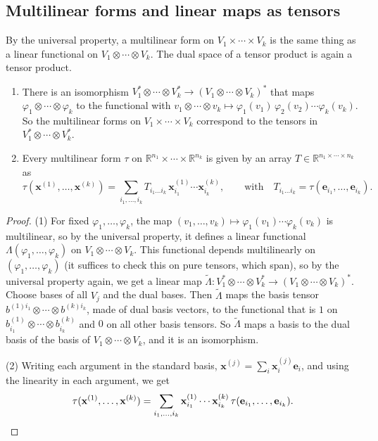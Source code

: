 \subsection{Multilinear forms and linear maps as tensors}

By the universal property, a multilinear form on $V_1 \times \cdots \times V_k$ is the same thing as a linear functional on $V_1 \otimes \cdots \otimes V_k$. The dual space of a tensor product is again a tensor product.

\begin{theorem}\label{L1-thm:multilinear-tensor}
    \begin{enumerate}
        \item There is an isomorphism $V_1^* \otimes \cdots \otimes V_k^* \to (V_1 \otimes \cdots \otimes V_k)^*$ that maps $\varphi_1 \otimes \cdots \otimes \varphi_k$ to the functional with $v_1 \otimes \cdots \otimes v_k \mapsto \varphi_1(v_1)\,\varphi_2(v_2) \cdots \varphi_k(v_k)$. So the multilinear forms on $V_1 \times \cdots \times V_k$ correspond to the tensors in $V_1^* \otimes \cdots \otimes V_k^*$.
        \item Every multilinear form $\tau$ on $\mathbb{R}^{n_1} \times \cdots \times \mathbb{R}^{n_k}$ is given by an array $T \in \mathbb{R}^{n_1 \times \cdots \times n_k}$ as
        \[\tau(\mathbf{x}^{(1)}, \ldots, \mathbf{x}^{(k)}) = \sum_{i_1, \ldots, i_k} T_{i_1 \ldots i_k}\, \mathbf{x}^{(1)}_{i_1} \cdots \mathbf{x}^{(k)}_{i_k}, \qquad \text{with} \quad T_{i_1 \ldots i_k} = \tau(\mathbf{e}_{i_1}, \ldots, \mathbf{e}_{i_k}).\]
    \end{enumerate}
\end{theorem}

\begin{proof}
    (1) For fixed $\varphi_1, \ldots, \varphi_k$, the map $(v_1, \ldots, v_k) \mapsto \varphi_1(v_1) \cdots \varphi_k(v_k)$ is multilinear, so by the universal property, it defines a linear functional $\Lambda(\varphi_1, \ldots, \varphi_k)$ on $V_1 \otimes \cdots \otimes V_k$. This functional depends multilinearly on $(\varphi_1, \ldots, \varphi_k)$ (it suffices to check this on pure tensors, which span), so by the universal property again, we get a linear map $\tilde\Lambda: V_1^* \otimes \cdots \otimes V_k^* \to (V_1 \otimes \cdots \otimes V_k)^*$. Choose bases of all $V_j$ and the dual bases. Then $\tilde\Lambda$ maps the basis tensor $b^{(1)i_1} \otimes \cdots \otimes b^{(k)i_k}$, made of dual basis vectors, to the functional that is $1$ on $b^{(1)}_{i_1} \otimes \cdots \otimes b^{(k)}_{i_k}$ and $0$ on all other basis tensors. So $\tilde\Lambda$ maps a basis to the dual basis of the basis of $V_1 \otimes \cdots \otimes V_k$, and it is an isomorphism.

    (2) Writing each argument in the standard basis, $\mathbf{x}^{(j)} = \sum_{i} \mathbf{x}^{(j)}_{i} \mathbf{e}_{i}$, and using the linearity in each argument, we get
    \[\tau(\mathbf{x}^{(1)}, \ldots, \mathbf{x}^{(k)}) = \sum_{i_1, \ldots, i_k} \mathbf{x}^{(1)}_{i_1} \cdots \mathbf{x}^{(k)}_{i_k}\, \tau(\mathbf{e}_{i_1}, \ldots, \mathbf{e}_{i_k}). \qedhere\]
\end{proof}

